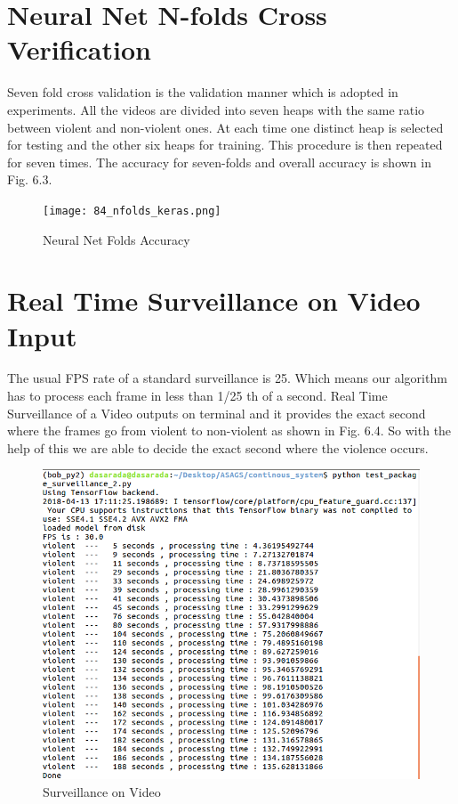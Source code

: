 \section{Neural Net N-folds Cross Verification}
Seven fold cross validation is the validation manner which is adopted in
experiments. All the videos are divided into seven heaps with the same ratio between
violent and non-violent ones. At each time one distinct heap is selected for testing and the other six heaps for training. This procedure is then repeated for seven times. The accuracy for seven-folds and overall accuracy is shown in Fig. 6.3.
\begin{figure}[H]
\centering
\texttt{[image: 84\_nfolds\_keras.png]}
\caption{Neural Net Folds Accuracy}
\end{figure}
\section{Real Time Surveillance on Video Input}
The usual FPS rate of a standard surveillance is 25. Which means our algorithm has to process each frame in less than 1/25 th of a second. Real Time Surveillance of a Video outputs on terminal and it provides the exact second where the frames go from violent to non-violent as shown in Fig. 6.4. So with the help of this we are able to decide the exact second where the violence occurs. 
\begin{figure}[H]
\centering
\includegraphics[width = \linewidth]{process_time.png}
\caption{Surveillance on Video}
\end{figure}
